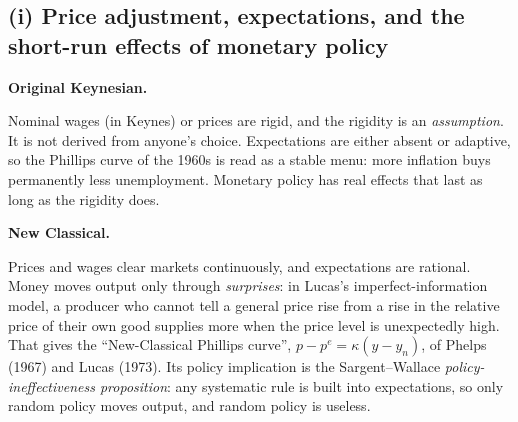 \documentclass[11pt, a4paper]{article}
\newcommand{\passo}[1]{\medskip\noindent\textbf{#1}\par\nobreak}
\begin{document}
\subsection*{(i) Price adjustment, expectations, and the short-run effects of monetary policy}

\passo{Original Keynesian.}
Nominal wages (in Keynes) or prices are rigid, and the rigidity is an \emph{assumption}. It is
not derived from anyone's choice. Expectations are either absent or adaptive, so the Phillips
curve of the 1960s is read as a stable menu: more inflation buys permanently less
unemployment. Monetary policy has real effects that last as long as the rigidity does.

\passo{New Classical.}
Prices and wages clear markets continuously, and expectations are rational. Money moves
output only through \emph{surprises}: in Lucas's imperfect-information model, a producer who
cannot tell a general price rise from a rise in the relative price of their own good supplies
more when the price level is unexpectedly high. That gives the ``New-Classical Phillips
curve'', $p-p^e=\kappa(y-y_n)$, of Phelps (1967) and Lucas (1973). Its policy implication is
the Sargent--Wallace \emph{policy-ineffectiveness proposition}: any systematic rule is built
into expectations, so only random policy moves output, and random policy is useless.
\end{document}
